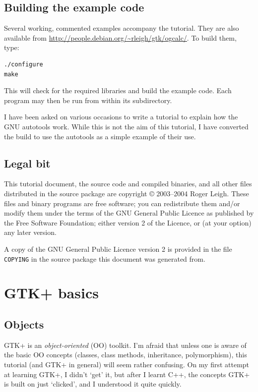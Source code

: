 \documentclass[a4paper,oneside]{article}
\newcommand{\filename}[1]{\texttt{#1}}
\begin{document}
\subsection{Building the example code}

Several working, commented examples accompany the tutorial.  They are
also available from
\url{http://people.debian.org/~rleigh/gtk/ogcalc/}.  To build them,
type:

\begin{verbatim}
./configure
make
\end{verbatim}

\noindent This will check for the required libraries and build the
example code.  Each program may then be run from within its
subdirectory.

I have been asked on various occasions to write a tutorial to explain
how the GNU autotools work.  While this is not the aim of this
tutorial, I have converted the build to use the autotools as a simple
example of their use.

\subsection{Legal bit}

This tutorial document, the source code and compiled binaries, and all
other files distributed in the source package are copyright
\copyright{} 2003--2004 Roger Leigh.  These files and binary programs
are free software; you can redistribute them and/or modify them under
the terms of the GNU General Public Licence as published by the Free
Software Foundation; either version 2 of the Licence, or (at your
option) any later version.

A copy of the GNU General Public Licence version 2 is provided in the
file \filename{COPYING} in the source package this document was
generated from.


\section{GTK+ basics}

\subsection{Objects}

GTK+ is an \emph{object-oriented} (OO) toolkit.  I'm afraid that
unless one is aware of the basic OO concepts (classes, class methods,
inheritance, polymorphism), this tutorial (and GTK+ in general) will
seem rather confusing.  On my first attempt at learning GTK+, I didn't
`get' it, but after I learnt C++, the concepts GTK+ is built on just
`clicked', and I understood it quite quickly.
\end{document}
